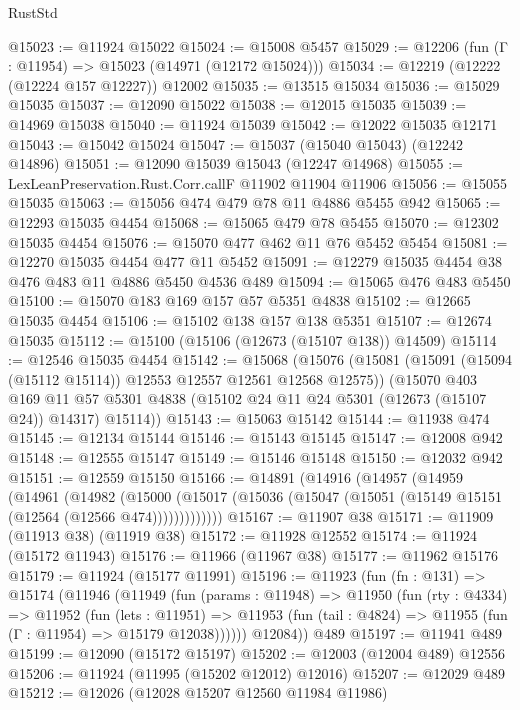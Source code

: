 \begin{lexlean}{RustStd}
\begin{coremodule}
@15023 := @11924 @15022
@15024 := @15008 @5457
@15029 := @12206 (fun (Γ : @11954) => @15023 (@14971 (@12172 @15024)))
@15034 := @12219 (@12222 (@12224 @157 @12227)) @12002
@15035 := @13515 @15034
@15036 := @15029 @15035
@15037 := @12090 @15022
@15038 := @12015 @15035
@15039 := @14969 @15038
@15040 := @11924 @15039
@15042 := @12022 @15035 @12171
@15043 := @15042 @15024
@15047 := @15037 (@15040 @15043) (@12242 @14896)
@15051 := @12090 @15039 @15043 (@12247 @14968)
@15055 := LexLeanPreservation.Rust.Corr.callF @11902 @11904 @11906
@15056 := @15055 @15035
@15063 := @15056 @474 @479 @78 @11 @4886 @5455 @942
@15065 := @12293 @15035 @4454
@15068 := @15065 @479 @78 @5455
@15070 := @12302 @15035 @4454
@15076 := @15070 @477 @462 @11 @76 @5452 @5454
@15081 := @12270 @15035 @4454 @477 @11 @5452
@15091 := @12279 @15035 @4454 @38 @476 @483 @11 @4886 @5450 @4536 @489
@15094 := @15065 @476 @483 @5450
@15100 := @15070 @183 @169 @157 @57 @5351 @4838
@15102 := @12665 @15035 @4454
@15106 := @15102 @138 @157 @138 @5351
@15107 := @12674 @15035
@15112 := @15100 (@15106 (@12673 (@15107 @138)) @14509)
@15114 := @12546 @15035 @4454
@15142 := @15068
    (@15076
      (@15081 (@15091 (@15094 (@15112 @15114)) @12553 @12557 @12561 @12568 @12575))
      (@15070
        @403
        @169
        @11
        @57
        @5301
        @4838
        (@15102 @24 @11 @24 @5301 (@12673 (@15107 @24)) @14317)
        @15114))
@15143 := @15063 @15142
@15144 := @11938 @474
@15145 := @12134 @15144
@15146 := @15143 @15145
@15147 := @12008 @942
@15148 := @12555 @15147
@15149 := @15146 @15148
@15150 := @12032 @942
@15151 := @12559 @15150
@15166 := @14891
    (@14916
      (@14957
        (@14959
          (@14961
            (@14982
              (@15000
                (@15017 (@15036 (@15047 (@15051 (@15149 @15151 (@12564 (@12566 @474)))))))))))))
@15167 := @11907 @38
@15171 := @11909 (@11913 @38) (@11919 @38)
@15172 := @11928 @12552
@15174 := @11924 (@15172 @11943)
@15176 := @11966 (@11967 @38)
@15177 := @11962 @15176
@15179 := @11924 (@15177 @11991)
@15196 := @11923
    (fun (fn : @131) =>
    @15174
      (@11946
        (@11949
          (fun (params : @11948) =>
          @11950
            (fun (rty : @4334) =>
            @11952
              (fun (lets : @11951) =>
              @11953 (fun (tail : @4824) => @11955 (fun (Γ : @11954) => @15179 @12038))))))
        @12084))
    @489
@15197 := @11941 @489
@15199 := @12090 (@15172 @15197)
@15202 := @12003 (@12004 @489) @12556
@15206 := @11924 (@11995 (@15202 @12012) @12016)
@15207 := @12029 @489
@15212 := @12026 (@12028 @15207 @12560 @11984 @11986)

\end{coremodule}
\end{lexlean}
